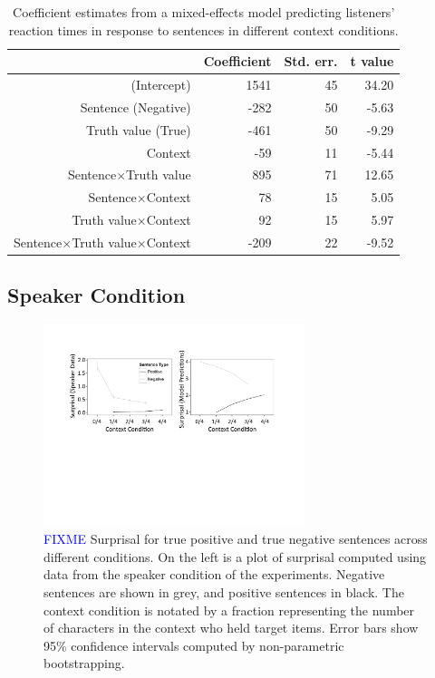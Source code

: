 \documentclass[man, noapacite]{apa2}
\begin{document}
\begin{table}[t]
\caption{Coefficient estimates from a mixed-effects model predicting listeners' reaction times in response to sentences in different context conditions.}
\begin{center}
\small\addtolength{\tabcolsep}{-5pt}
\begin{tabular}{rrrr}
  \hline
 & Coefficient & Std. err. & t value \\ 
  \hline
(Intercept) & 1541 & 45 & 34.20 \\ 
  Sentence (Negative) & -282 & 50 & -5.63  \\ 
  Truth value (True) & -461 & 50 & -9.29 \\
  Context & -59 & 11 & -5.44 \\ 
  Sentence$\times$Truth value & 895 & 71 & 12.65 \\
  Sentence$\times$Context & 78 & 15 & 5.05 \\
  Truth value$\times$Context & 92 & 15 & 5.97 \\
  Sentence$\times$Truth value$\times$Context & -209 & 22 & -9.52 \\
   \hline
\end{tabular}
\vspace{-1.5cm}
\end{center}
\end{table}

\subsection{Speaker Condition}

\begin{figure}[t]
\begin{center} 
\includegraphics[width=3in]{figures/surprisals.pdf}
\caption{\label{fig:e2line} \textcolor{blue}{FIXME} Surprisal for true positive and true negative sentences across different conditions. On the left is a plot of surprisal computed using data from the speaker condition of the experiments.  Negative sentences are shown in grey, and positive sentences in black.  The context condition is notated by a fraction representing the number of characters in the context who held target items. Error bars show 95\% confidence intervals computed by non-parametric bootstrapping.  }
\end{center} 
\end{figure}
\end{document}
